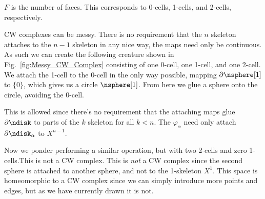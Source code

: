 \documentclass{book}                                                           %
\begin{document}
            $F$ is the number of faces. This corresponds to 0-cells, 1-cells,
            and 2-cells, respectively.
            \par\hfill\par
            \hfill
            \begin{minipage}[t]{0.56\textwidth}
                CW complexes can be messy. There is no requirement that the $n$
                skeleton attaches to the $n-1$ skeleton in any nice way, the
                maps need only be continuous. As such we can create the
                following creature shown in Fig.~\ref{fig:Messy_CW_Complex}
                consisting of one 0-cell, one 1-cell, and one 2-cell. We attach
                the 1-cell to the 0-cell in the only way possible, mapping
                $\partial\nsphere[1]$ to $\{0\}$, which gives us a circle
                $\nsphere[1]$. From here we glue a sphere onto the circle,
                avoiding the 0-cell.

            \end{minipage}
            \par\vspace{2.5ex}
            This is allowed since there's no requirement that the attaching
            maps glue $\partial\ndisk$ to parts of the $k$ skeleton for all
            $k<n$. The $\varphi_{\alpha}$ need only attach
            $\partial\ndisk_{\alpha}$ to $X^{n-1}$.
            \par\hfill\par
            \begin{minipage}[t]{0.56\textwidth}
                Now we ponder performing a similar operation, but with two
                2-cells and zero 1-cells.This is not a CW complex. This is
                \textit{not} a CW complex since the second sphere is attached
                to another sphere, and not to the 1-skeleton $X^{1}$. This space
                is homeomorphic to a CW complex since we can simply introduce
                more points and edges, but as we have currently drawn it is not.
            \end{minipage}
\end{document}
